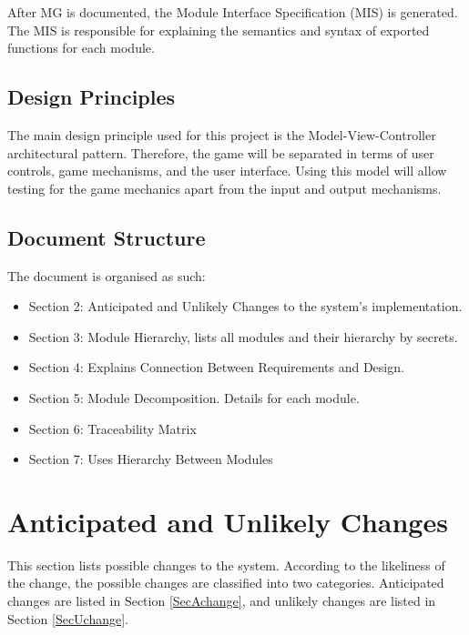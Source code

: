 \documentclass[12pt, titlepage]{article}
\begin{document}
  After MG is documented, the Module Interface Specification (MIS) is generated. The MIS is responsible for explaining the semantics and syntax of exported functions for each module.

\subsection{Design Principles}

The main design principle used for this project is the Model-View-Controller architectural pattern. Therefore, the game will be separated in terms of user controls, game mechanisms, and the user interface. Using this model will allow testing for the game mechanics apart from the input and output mechanisms.

\subsection{Document Structure}

The document is organised as such:

\begin{itemize}

\item Section 2: Anticipated and Unlikely Changes to the system's implementation.

\item Section 3: Module Hierarchy, lists all modules and their hierarchy by secrets.

\item Section 4: Explains Connection Between Requirements and Design.

\item Section 5: Module Decomposition. Details for each module.

\item Section 6: Traceability Matrix

\item Section 7: Uses Hierarchy Between Modules

\end{itemize}

\section{Anticipated and Unlikely Changes} \label{SecChange}

This section lists possible changes to the system. According to the likeliness
of the change, the possible changes are classified into two
categories. Anticipated changes are listed in Section \ref{SecAchange}, and
unlikely changes are listed in Section \ref{SecUchange}.
\end{document}
